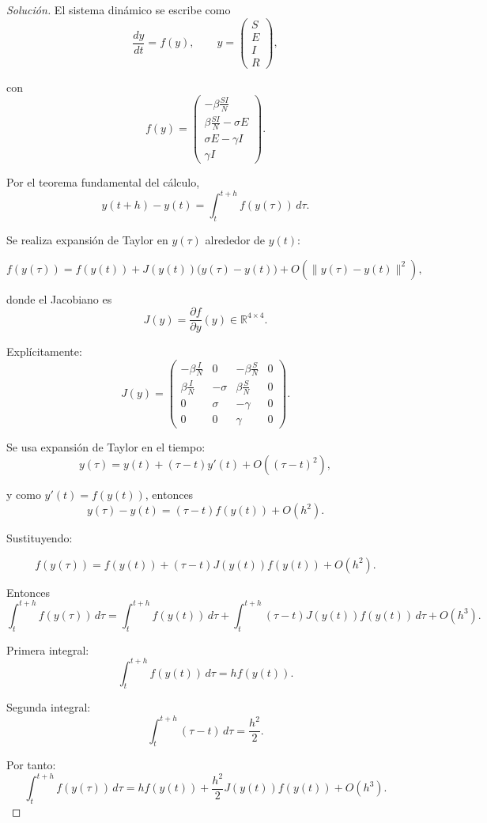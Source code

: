 \documentclass[12pt,spanish,mexico]{article}
\numberwithin{equation}{section}
\newcommand{\R}{\mathbb{R}}
\theoremstyle{definition}
\theoremstyle{remark}
\newenvironment{solution}{\begin{proof}[Solución]}{\end{proof}}
\begin{document}
\begin{solution}

El sistema dinámico se escribe como
\[
\frac{dy}{dt}=f(y),
\qquad
y=
\begin{pmatrix}
S\\E\\I\\R
\end{pmatrix},
\]

con
\[
f(y)=
\begin{pmatrix}
-\beta \frac{SI}{N}\\
\beta \frac{SI}{N}-\sigma E\\
\sigma E-\gamma I\\
\gamma I
\end{pmatrix}.
\]

Por el teorema fundamental del cálculo,
\[
y(t+h)-y(t)=\int_t^{t+h} f(y(\tau))\,d\tau.
\]


Se realiza expansión de Taylor en $y(\tau)$ alrededor de $y(t)$:

\[
f(y(\tau))
=
f(y(t)) + J(y(t))\big(y(\tau)-y(t)\big) + O(\|y(\tau)-y(t)\|^2),
\]

donde el Jacobiano es
\[
J(y)=\frac{\partial f}{\partial y}(y)\in\mathbb{R}^{4\times 4}.
\]

Explícitamente:
\[
J(y)=
\begin{pmatrix}
-\beta \frac{I}{N} & 0 & -\beta \frac{S}{N} & 0 \\
\beta \frac{I}{N} & -\sigma & \beta \frac{S}{N} & 0 \\
0 & \sigma & -\gamma & 0 \\
0 & 0 & \gamma & 0
\end{pmatrix}.
\]

Se usa expansión de Taylor en el tiempo:
\[
y(\tau)=y(t)+(\tau-t)y'(t)+O((\tau-t)^2),
\]

y como $y'(t)=f(y(t))$, entonces
\[
y(\tau)-y(t)=(\tau-t)f(y(t))+O(h^2).
\]


Sustituyendo:

\[
f(y(\tau))
=
f(y(t)) + (\tau-t)J(y(t))f(y(t)) + O(h^2).
\]

Entonces
\[
\int_t^{t+h} f(y(\tau))\,d\tau
=
\int_t^{t+h} f(y(t))\,d\tau
+
\int_t^{t+h} (\tau-t)J(y(t))f(y(t))\,d\tau
+
O(h^3).
\]


Primera integral:
\[
\int_t^{t+h} f(y(t))\,d\tau = h f(y(t)).
\]

Segunda integral:
\[
\int_t^{t+h} (\tau-t)\,d\tau = \frac{h^2}{2}.
\]

Por tanto:
\[
\int_t^{t+h} f(y(\tau))\,d\tau
=
h f(y(t))
+
\frac{h^2}{2}J(y(t))f(y(t))
+
O(h^3).
\]



\end{solution}
\end{document}
